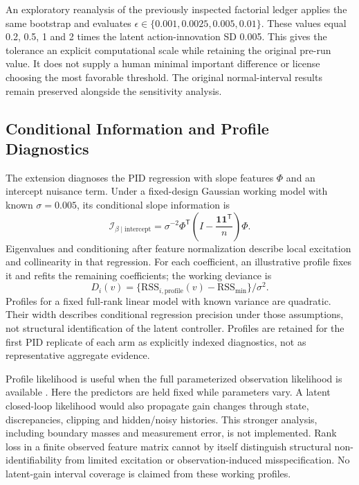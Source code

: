 An exploratory reanalysis of the previously inspected factorial ledger applies the same bootstrap and evaluates $\epsilon\in\{0.001,0.0025,0.005,0.01\}$. These values equal 0.2, 0.5, 1 and 2 times the latent action-innovation SD 0.005. This gives the tolerance an explicit computational scale while retaining the original pre-run value. It does not supply a human minimal important difference or license choosing the most favorable threshold. The original normal-interval results remain preserved alongside the sensitivity analysis.

\subsection{Conditional Information and Profile Diagnostics}

The extension diagnoses the PID regression with slope features $\Phi$ and an intercept nuisance term. Under a fixed-design Gaussian working model with known $\sigma=0.005$, its conditional slope information is
\[
\mathcal I_{\beta\mid\mathrm{intercept}}
=\sigma^{-2}\Phi^{\mathsf T}
\left(I-\frac{\mathbf 1\mathbf 1^{\mathsf T}}{n}\right)\Phi.
\]
Eigenvalues and conditioning after feature normalization describe local excitation and collinearity in that regression. For each coefficient, an illustrative profile fixes it and refits the remaining coefficients; the working deviance is
\[
D_i(v)=\{\mathrm{RSS}_{i,\mathrm{profile}}(v)-\mathrm{RSS}_{\min}\}/\sigma^2.
\]
Profiles for a fixed full-rank linear model with known variance are quadratic. Their width describes conditional regression precision under those assumptions, not structural identification of the latent controller. Profiles are retained for the first PID replicate of each arm as explicitly indexed diagnostics, not as representative aggregate evidence.

Profile likelihood is useful when the full parameterized observation likelihood is available \parencite{raue2009profile}. Here the predictors are held fixed while parameters vary. A latent closed-loop likelihood would also propagate gain changes through state, discrepancies, clipping and hidden/noisy histories. This stronger analysis, including boundary masses and measurement error, is not implemented. Rank loss in a finite observed feature matrix cannot by itself distinguish structural non-identifiability from limited excitation or observation-induced misspecification. No latent-gain interval coverage is claimed from these working profiles.
